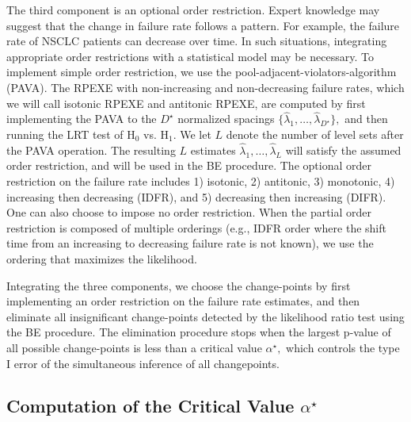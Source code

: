 \documentclass[12pt] {article}
\begin{document}
The third component is an optional order restriction.
Expert knowledge may suggest that the change in failure
rate follows a pattern. For example, the failure rate of NSCLC
patients can decrease over time.
In such situations, integrating appropriate order restrictions
with a statistical model may be necessary. To implement simple
order restriction, we use the pool-adjacent-violators-algorithm
(PAVA). The RPEXE with non-increasing
and non-decreasing failure rates, which we will call isotonic
RPEXE and antitonic RPEXE, are computed by first implementing
the PAVA to the $D^\star$ normalized spacings
$\{\widehat{\lambda}_1,\ldots, \widehat{\lambda}_{D^\star}\},$
and then running the LRT test of H$_0$ vs. H$_1.$ We let $L$
denote the number of level sets after the PAVA operation.
The resulting $L$ estimates $\widehat{\lambda}_1,\ldots, \widehat{\lambda}_L$
will satisfy the assumed order restriction,
and will be used in the BE procedure. The optional order restriction
on the failure rate includes 1) isotonic, 2) antitonic, 3) monotonic,
4) increasing then decreasing (IDFR), and 5) decreasing then increasing (DIFR).
One can also choose to impose no order restriction.
When the partial order restriction is composed of multiple
orderings (e.g., IDFR order where the shift time from an
increasing to decreasing failure rate is not known), we
use the ordering that maximizes the likelihood.

Integrating the three components, we choose the change-points
by first implementing an order restriction on the failure rate
estimates, and then eliminate all insignificant change-points
detected by the likelihood ratio test using the BE procedure.
The elimination procedure stops when the largest p-value of
all possible change-points is less than a critical value
$\alpha^\star,$ which controls the type I error of the
simultaneous inference of all changepoints.


\subsection{Computation of the Critical Value $\alpha^\star$ }
\end{document}

